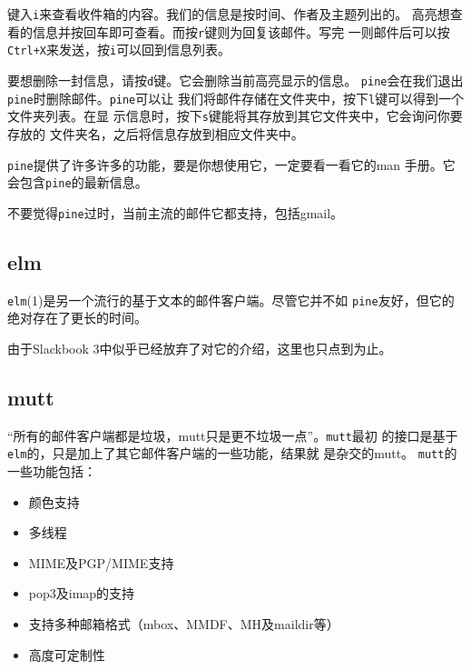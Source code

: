 键入\texttt{i}来查看收件箱的内容。我们的信息是按时间、作者及主题列出的。
高亮想查看的信息并按回车即可查看。而按\texttt{r}键则为回复该邮件。写完
一则邮件后可以按\texttt{Ctrl+X}来发送，按\texttt{i}可以回到信息列表。

要想删除一封信息，请按\texttt{d}键。它会删除当前高亮显示的信息。
\texttt{pine}会在我们退出\texttt{pine}时删除邮件。\texttt{pine}可以让
我们将邮件存储在文件夹中，按下\texttt{l}键可以得到一个文件夹列表。在显
示信息时，按下\texttt{s}键能将其存放到其它文件夹中，它会询问你要存放的
文件夹名，之后将信息存放到相应文件夹中。

\texttt{pine}提供了许多许多的功能，要是你想使用它，一定要看一看它的man
手册。它会包含\texttt{pine}的最新信息。

不要觉得\texttt{pine}过时，当前主流的邮件它都支持，包括gmail。

\subsection{elm}
\label{chap:basicNetworkCommands:email:elm}

\texttt{elm}(1)是另一个流行的基于文本的邮件客户端。尽管它并不如
\texttt{pine}友好，但它的绝对存在了更长的时间。

由于Slackbook 3中似乎已经放弃了对它的介绍，这里也只点到为止。

\subsection{mutt}
\label{chap:basicNetworkCommands:email:mutt}
``所有的邮件客户端都是垃圾，mutt只是更不垃圾一点''。\texttt{mutt}最初
的接口是基于\texttt{elm}的，只是加上了其它邮件客户端的一些功能，结果就
是杂交的mutt。
\texttt{mutt}的一些功能包括：
\begin{itemize}
\item 颜色支持
\item 多线程
\item MIME及PGP/MIME支持
\item pop3及imap的支持
\item 支持多种邮箱格式（mbox、MMDF、MH及maildir等）
\item 高度可定制性
\end{itemize}

